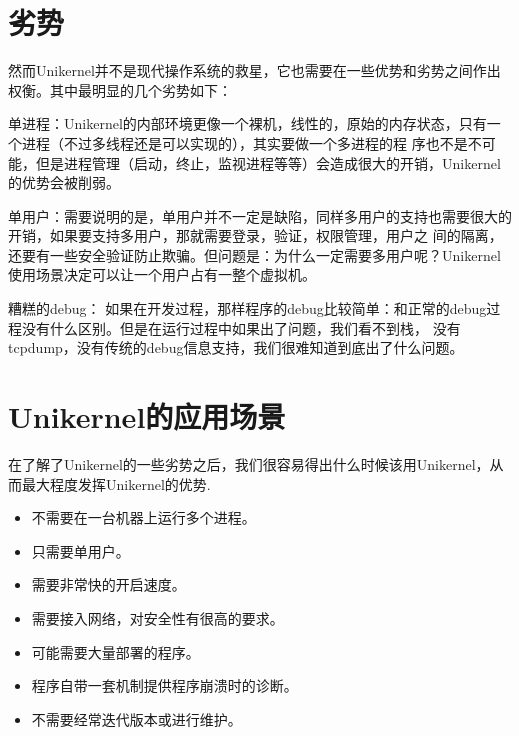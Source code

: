 \section{劣势}

然而Unikernel并不是现代操作系统的救星，它也需要在一些优势和劣势之间作出权衡。其中最明显的几个劣势如下：

单进程：Unikernel的内部环境更像一个裸机，线性的，原始的内存状态，只有一个进程（不过多线程还是可以实现的），其实要做一个多进程的程
序也不是不可能，但是进程管理（启动，终止，监视进程等等）会造成很大的开销，Unikernel的优势会被削弱。

单用户：需要说明的是，单用户并不一定是缺陷，同样多用户的支持也需要很大的开销，如果要支持多用户，那就需要登录，验证，权限管理，用户之
间的隔离，还要有一些安全验证防止欺骗。但问题是：为什么一定需要多用户呢？Unikernel使用场景决定可以让一个用户占有一整个虚拟机。

糟糕的debug： 如果在开发过程，那样程序的debug比较简单：和正常的debug过程没有什么区别。但是在运行过程中如果出了问题，我们看不到栈，
没有tcpdump，没有传统的debug信息支持，我们很难知道到底出了什么问题。

\section{Unikernel的应用场景}

在了解了Unikernel的一些劣势之后，我们很容易得出什么时候该用Unikernel，从而最大程度发挥Unikernel的优势.

\begin{itemize}
    \item 不需要在一台机器上运行多个进程。
    \item 只需要单用户。
    \item 需要非常快的开启速度。
    \item 需要接入网络，对安全性有很高的要求。
    \item 可能需要大量部署的程序。
    \item 程序自带一套机制提供程序崩溃时的诊断。
    \item 不需要经常迭代版本或进行维护。
\end{itemize}